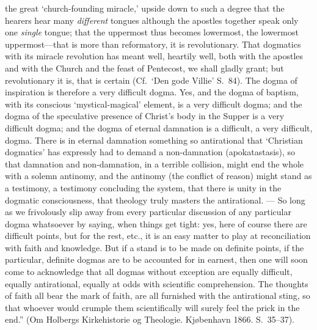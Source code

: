 \documentclass[12pt]{book}
\newcommand{\opage}[1]{\marginnote{\footnotesize\textit{[#1]}}}
\begin{document}
the great `church-founding miracle,' upside down to such a degree that
the hearers hear many \emph{different} tongues although the apostles
together speak only one \emph{single} tongue; that the uppermost thus
becomes lowermost, the lowermost uppermost---that is more than
reformatory, it is revolutionary. That dogmatics with its miracle
revolution has meant well, heartily well, both with the apostles and
with the Church and the feast of Pentecost, we shall gladly grant; but
revolutionary it is, that is certain (Cf.\ `Den gode Villie' S.~84).
The dogma of inspiration is therefore a very difficult
\opage{241}\setcounter{footnote}{0}%
dogma. Yes, and the dogma of baptism, with its conscious `mystical-magical'
element, is a very difficult dogma; and the dogma of the speculative presence
of Christ's body in the Supper is a very difficult dogma; and the dogma of
eternal damnation is a difficult, a very difficult, dogma. There is in eternal
damnation something so antirational that `Christian dogmatics' has
expressly had to demand a non-damnation (apokatastasis), so that damnation and
non-damnation, in a terrible collision, might end the whole with a solemn
antinomy, and the antinomy (the conflict of reason) might stand as a
testimony, a testimony concluding the system, that there is unity in the
dogmatic consciousness, that theology truly masters the antirational. ---
So long as we frivolously slip away from every particular discussion of any
particular dogma whatsoever by saying, when things get tight: yes, here of
course there are difficult points, but for the rest, etc., it is an easy
matter to play at reconciliation with faith and knowledge. But if a stand is
to be made on definite points, if the particular, definite dogmas are to be
accounted for in earnest, then one will soon come to acknowledge that all
dogmas without exception are equally difficult, equally antirational, equally
at odds with scientific comprehension. The thoughts of faith all bear the mark
of faith, are all furnished with the antirational sting, so that whoever would
crumple them scientifically will surely feel the prick in the end.'' (Om
Holbergs Kirkehistorie og Theologie. Kjøbenhavn 1866. S.~35--37).
\end{document}
